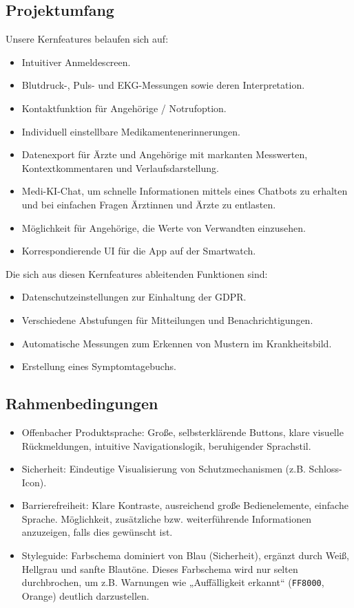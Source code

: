 \subsection{Projektumfang}
Unsere Kernfeatures belaufen sich auf:
\begin{itemize}
	\item Intuitiver Anmeldescreen.
	\item Blutdruck-, Puls- und EKG-Messungen sowie deren Interpretation.
	\item Kontaktfunktion für Angehörige / Notrufoption.
	\item Individuell einstellbare Medikamentenerinnerungen.
	\item Datenexport für Ärzte und Angehörige mit markanten Messwerten, Kontextkommentaren und Verlaufsdarstellung.
	\item Medi-KI-Chat, um schnelle Informationen mittels eines Chatbots zu erhalten und bei einfachen Fragen Ärztinnen und Ärzte zu entlasten.
	\item Möglichkeit für Angehörige, die Werte von Verwandten einzusehen.
	\item Korrespondierende UI für die App auf der Smartwatch.
\end{itemize}

Die sich aus diesen Kernfeatures ableitenden Funktionen sind:
\begin{itemize}
	\item Datenschutzeinstellungen zur Einhaltung der GDPR.
	\item Verschiedene Abstufungen für Mitteilungen und Benachrichtigungen.
	\item Automatische Messungen zum Erkennen von Mustern im Krankheitsbild.
	\item Erstellung eines Symptomtagebuchs.
\end{itemize}

\subsection{Rahmenbedingungen}
\begin{itemize}
	\item Offenbacher Produktsprache: Große, selbsterklärende Buttons, klare visuelle Rückmeldungen, intuitive Navigationslogik, beruhigender Sprachstil.
	\item Sicherheit: Eindeutige Visualisierung von Schutzmechanismen (z.B. Schloss-Icon).
	\item Barrierefreiheit: Klare Kontraste, ausreichend große Bedienelemente, einfache Sprache. Möglichkeit, zusätzliche bzw. weiterführende Informationen anzuzeigen, falls dies gewünscht ist.
	\item Styleguide: Farbschema dominiert von Blau (Sicherheit), ergänzt durch Weiß, Hellgrau und sanfte Blautöne. Dieses Farbschema wird nur selten durchbrochen, um z.B. Warnungen wie „Auffälligkeit erkannt“ (\texttt{FF8000}, Orange) deutlich darzustellen.
\end{itemize}
